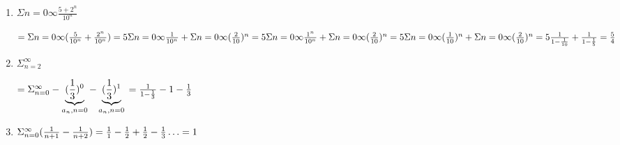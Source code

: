 \documentclass[12pt,a4paper]{scrreprt}
\begin{document}
\begin{enumerate}
\begin{enumerate}
\item $\Sigma{n=0}{\infty} \frac{5+2^n}{10^n}$
 
$=  \Sigma{n=0}{\infty} (\frac{5}{10^n} + \frac{2^n}{10^n})	\\
=  5 \Sigma{n=0}{\infty} \frac{1}{10^n} +  \Sigma{n=0}{\infty} (\frac{2}{10})^n	\\
=  5 \Sigma{n=0}{\infty} \frac{1^n}{10^n} +  \Sigma{n=0}{\infty} (\frac{2}{10})^n	\\
=  5 \Sigma{n=0}{\infty} (\frac{1}{10})^n +  \Sigma{n=0}{\infty} (\frac{2}{10})^n	\\
=  5 \frac{1}{1-\frac{1}{10}} + \frac{1}{1-\frac{1}{5}} = \frac{5}{4}$

\item $\Sigma_{n=2}^{\infty}$

$= \Sigma_{n=0}^{\infty} - \underbrace{(\frac{1}{3})^0}_{a_n, n=0} - \underbrace{(\frac{1}{3})^1}_{a_n, n=0} \\
= \frac{1}{1-\frac{1}{3}} - 1 - \frac{1}{3}$

\item $\Sigma_{n=0}^{\infty} (\frac{1}{n+1} - \frac{1}{n+2}) \\
= \frac{1}{1}- \frac{1}{2} +  \frac{1}{2}- \frac{1}{3} \ldots = 1 $

\end{enumerate}


\end{enumerate}
\end{document}
